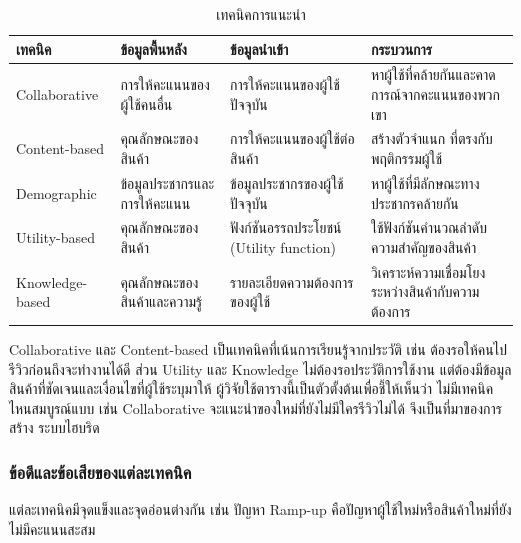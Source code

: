 \begin{table}[H]
\centering
\caption{เทคนิคการแนะนำ \cite{hybrid_nd}}
\label{tab:Recommendation techniques}
\begin{tabular}{|p{2.5cm}|p{3.8cm}|p{3.8cm}|p{4cm}|}
\hline
\textbf{เทคนิค} & \textbf{ข้อมูลพื้นหลัง} & \textbf{ข้อมูลนำเข้า} & \textbf{กระบวนการ} \\
\hline
Collaborative & การให้คะแนนของผู้ใช้คนอื่น & การให้คะแนนของผู้ใช้ปัจจุบัน & หาผู้ใช้ที่คล้ายกันและคาดการณ์จากคะแนนของพวกเขา \\ \hline
Content-based & คุณลักษณะของสินค้า & การให้คะแนนของผู้ใช้ต่อสินค้า & สร้างตัวจำแนก ที่ตรงกับพฤติกรรมผู้ใช้ \\ \hline
Demographic & ข้อมูลประชากรและการให้คะแนน & ข้อมูลประชากรของผู้ใช้ปัจจุบัน & หาผู้ใช้ที่มีลักษณะทางประชากรคล้ายกัน \\\hline
Utility-based & คุณลักษณะของสินค้า & ฟังก์ชันอรรถประโยชน์ (Utility function) & ใช้ฟังก์ชันคำนวณลำดับความสำคัญของสินค้า \\ \hline
Knowledge-based & คุณลักษณะของสินค้าและความรู้ & รายละเอียดความต้องการของผู้ใช้ & วิเคราะห์ความเชื่อมโยงระหว่างสินค้ากับความต้องการ \\\hline
\end{tabular}
\end{table}

Collaborative และ Content-based เป็นเทคนิคที่เน้นการเรียนรู้จากประวัติ เช่น ต้องรอให้คนไปรีวิวก่อนถึงจะทำงานได้ดี ส่วน Utility และ Knowledge ไม่ต้องรอประวัติการใช้งาน แต่ต้องมีข้อมูลสินค้าที่ชัดเจนและเงื่อนไขที่ผู้ใช้ระบุมาให้ ผู้วิจัยใช้ตารางนี้เป็นตัวตั้งต้นเพื่อชี้ให้เห็นว่า ไม่มีเทคนิคไหนสมบูรณ์แบบ เช่น Collaborative จะแนะนำของใหม่ที่ยังไม่มีใครรีวิวไม่ได้ จึงเป็นที่มาของการสร้าง ระบบไฮบริด


\subsubsection{ข้อดีและข้อเสียของแต่ละเทคนิค}

แต่ละเทคนิคมีจุดแข็งและจุดอ่อนต่างกัน เช่น ปัญหา Ramp-up คือปัญหาผู้ใช้ใหม่หรือสินค้าใหม่ที่ยังไม่มีคะแนนสะสม \cite{hybrid_nd} 

